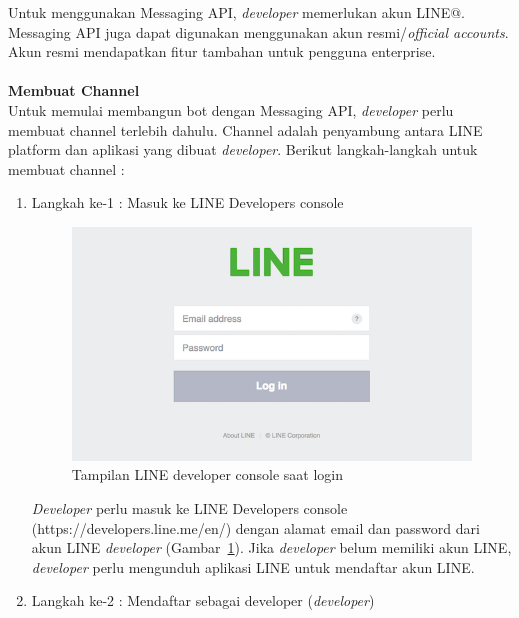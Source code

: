 \documentclass[a4paper,twoside]{article}
\begin{document}
\begin{enumerate}
\begin{enumerate}
		Untuk menggunakan Messaging API, \textit{developer} memerlukan akun LINE@. Messaging API juga dapat digunakan menggunakan akun resmi/\textit{official accounts}. Akun resmi mendapatkan fitur tambahan untuk pengguna enterprise.
\\
\\
\textbf{Membuat Channel}\\
Untuk memulai membangun bot dengan Messaging API, \textit{developer} perlu membuat channel terlebih dahulu. Channel adalah penyambung antara LINE platform dan aplikasi yang dibuat \textit{developer}. Berikut langkah-langkah untuk membuat channel :
\begin{enumerate}
\item Langkah ke-1 : Masuk ke LINE Developers console

\begin{figure}[H]
	\centering  
	\includegraphics[scale=0.4]{Gambar/line-developers-console-login.png}  
	\caption[Tampilan LINE developer console saat login]{Tampilan LINE developer console saat login} 
	\label{fig:line-developers-console-login} 
\end{figure}

\textit{Developer} perlu masuk ke LINE Developers console (https://developers.line.me/en/) dengan alamat email dan password dari akun LINE \textit{developer} (Gambar~\ref{fig:line-developers-console-login}). Jika \textit{developer} belum memiliki akun LINE, \textit{developer} perlu mengunduh aplikasi LINE untuk mendaftar akun LINE.

\item Langkah ke-2 : Mendaftar sebagai developer (\textit{developer})


\end{enumerate}
\end{enumerate}
\end{enumerate}
\end{document}
